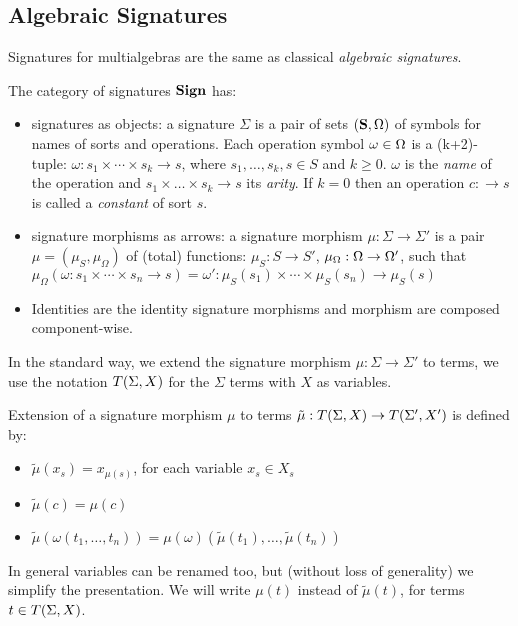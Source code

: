 \subsection{Algebraic Signatures}

Signatures for multialgebras are the same as classical {\it algebraic signatures}.
%
\begin{definition}\label{de:Sign}
The category of signatures ${\bf Sign}$ has:
\begin{itemize}\MyLPar
\item signatures as objects: a signature
$\Sigma$ is a pair of sets $({\bf S},\Omega)$ of symbols for names of sorts and
operations. Each operation symbol $\omega\in\Omega$ is a (k+2)-tuple:
$\omega : s_1 \times \cdots \times s_k \to s$,
where {$s_1, \ldots , s_k,s \in S$ and $k \geq 0$}.  $\omega$ is the
{\it name} of the operation and $s_1 \times \ldots \times s_k \to s$ its {\it
arity}. If $ k=0$ then an operation $c: \to s$ is called a {\it constant} of
sort $s$.
\item  signature morphisms as arrows: 
a signature morphism $\mu: \Sigma \to \Sigma'$ is a pair $\mu = (\mu_S,
\mu_{\Omega})$ of (total) functions:
$\mu_S: S \to S'$, $\mu_{\Omega}: \Omega \to \Omega'$, 
such that 
$ \mu_{\Omega}(\omega:s_1 \times \cdots \times s_n \to s) =
\omega':\mu_S(s_1) \times \cdots \times \mu_S(s_n) \to \mu_S(s)$
\item
Identities are the identity
signature morphisms and morphism are composed component-wise.
\end{itemize}
\end{definition}
%
In the standard way, 
we extend the signature morphism $\mu : \Sigma \to \Sigma'$ to terms, we use the notation $T(\Sigma,X)$ for the $\Sigma$ terms with $X$ as variables.

\begin{definition} Extension of a
signature morphism $\mu$ to terms ${\tilde{\mu}} : T(\Sigma,X) \to T(\Sigma',X')$ is defined by:
\begin{itemize}\MyLPar
\item ${\tilde{\mu}} (x_s) = x_{\mu (s)}$, for each variable $x_s \in X_s$
\item ${\tilde{\mu}} (c) = \mu(c)$
\item ${\tilde{\mu}} (\omega(t_1, \ldots ,t_n )) = \mu(\omega)({\tilde{\mu}}(t_1), \ldots , {\tilde{\mu}}(t_n))$
\end{itemize}
\end{definition}
In general variables can be renamed too, but (without loss of generality) we simplify the presentation. 
We will write $\mu(t)$
instead of ${\tilde{\mu}}(t)$, for terms $t \in T(\Sigma,X)$.

